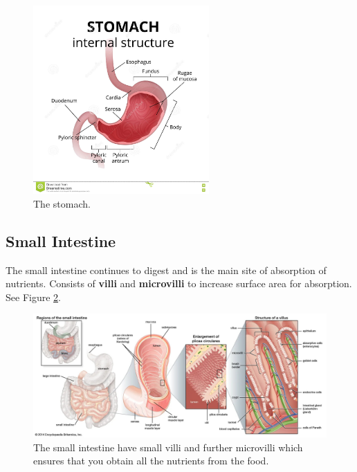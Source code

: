 \documentclass[12pt]{report}
\begin{document}
\begin{figure}[H]
\centering
    \includegraphics[width=0.6\textwidth]{../figures/stomach}
    \caption{The stomach.}
    \label{fig:stomach}
\end{figure}

\subsection{Small Intestine}
\begin{definition}
    The small intestine continues to digest and is the main site of absorption of nutrients. Consists of \textbf{villi} and \textbf{microvilli} to increase surface area for absorption. See Figure \ref{fig:small-intestine}.
\end{definition}

\begin{figure}[H]
\centering
    \includegraphics[width=\textwidth]{../figures/small intestine.jpg}
    \caption{The small intestine have small villi and further microvilli which ensures that you obtain all the nutrients from the food.}
    \label{fig:small-intestine}
\end{figure}
\end{document}
